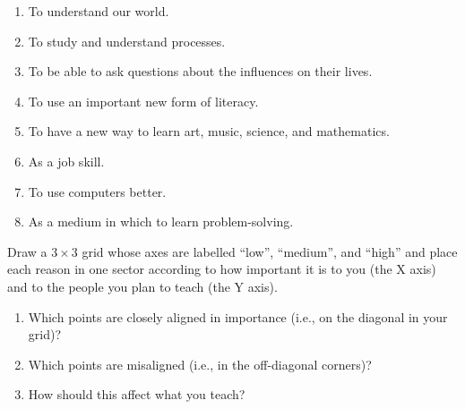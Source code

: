 \begin{enumerate}

\item
  To understand our world.

\item
  To study and understand processes.

\item
  To be able to ask questions about the influences on their lives.

\item
  To use an important new form of literacy.

\item
  To have a new way to learn art, music, science, and mathematics.

\item
  As a job skill.

\item
  To use computers better.

\item
  As a medium in which to learn problem-solving.

\end{enumerate}

Draw a $3{\times}3$ grid whose axes are labelled ``low'', ``medium'', and ``high''
and place each reason in one sector
according to how important it is to you (the X axis)
and to the people you plan to teach (the Y axis).

\begin{enumerate}

\item
  Which points are closely aligned in importance
  (i.e., on the diagonal in your grid)?

\item
  Which points are misaligned
  (i.e., in the off-diagonal corners)?

\item
  How should this affect what you teach?

\end{enumerate}
